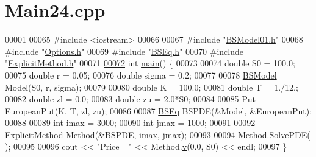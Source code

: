 \hypertarget{Main24_8cpp_source}{\section{Main24.\+cpp}
}

\begin{DoxyCode}
00001 
00065 \textcolor{preprocessor}{#include <iostream>}
00066 
00067 \textcolor{preprocessor}{#include "\hyperlink{BSModel01_8h}{BSModel01.h}"}
00068 \textcolor{preprocessor}{#include "\hyperlink{Options_8h}{Options.h}"}
00069 \textcolor{preprocessor}{#include "\hyperlink{BSEq_8h}{BSEq.h}"}
00070 \textcolor{preprocessor}{#include "\hyperlink{ExplicitMethod_8h}{ExplicitMethod.h}"}
00071 
\hypertarget{Main24_8cpp_source_l00072}{}\hyperlink{Main24_8cpp_ae66f6b31b5ad750f1fe042a706a4e3d4}{00072} \textcolor{keywordtype}{int} \hyperlink{Main24_8cpp_ae66f6b31b5ad750f1fe042a706a4e3d4}{main}() \{
00073 
00074   \textcolor{keywordtype}{double} S0 = 100.0;
00075   \textcolor{keywordtype}{double} r = 0.05;
00076   \textcolor{keywordtype}{double} sigma = 0.2;
00077 
00078   \hyperlink{classBSModel}{BSModel} Model(S0, r, sigma);
00079 
00080   \textcolor{keywordtype}{double} K = 100.0;
00081   \textcolor{keywordtype}{double} T = 1./12.;
00082   \textcolor{keywordtype}{double} zl = 0.0;
00083   \textcolor{keywordtype}{double} zu = 2.0*S0;
00084 
00085   \hyperlink{classPut}{Put} EuropeanPut(K, T, zl, zu);
00086 
00087   \hyperlink{classBSEq}{BSEq} BSPDE(&Model, &EuropeanPut);
00088 
00089   \textcolor{keywordtype}{int} imax = 3000;
00090   \textcolor{keywordtype}{int} jmax = 1000;
00091 
00092   \hyperlink{classExplicitMethod}{ExplicitMethod} Method(&BSPDE, imax, jmax);
00093 
00094   Method.\hyperlink{classExplicitMethod_ac2c2d5bac3fc414851c2810ff916c2d6}{SolvePDE}( );
00095 
00096   cout << \textcolor{stringliteral}{"Price ="} << Method.\hyperlink{classFDMethod_a703b25f3d7f5083bfd9fbbe9e1906946}{v}(0.0, S0) << endl;
00097 \}
\end{DoxyCode}
